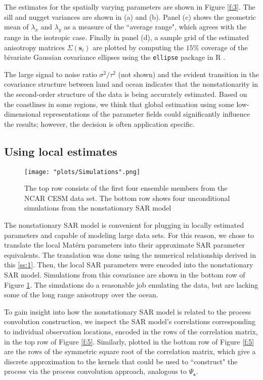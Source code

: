 \documentclass[review]{elsarticle}
\begin{document}
The estimates for the spatially varying parameters are shown in Figure \ref{f:3}. The sill and nugget variances are shown in (a) and (b). Panel (c) shows the geometric mean of $\lambda_x$ and $\lambda_y$ as a measure of the ``average range", which agrees with the range in the isotropic case. Finally in panel (d), a sample grid of the estimated anisotropy matrices $\Sigma(\mathbf s_i)$ are plotted by computing the $15\%$ coverage of the bivariate Gaussian covariance ellipses using the \texttt{ellipse} package in R \cite{ellipse}.

The large signal to noise ratio $\sigma^2/\tau^2$ (not shown) and the evident transition in the covariance structure between land and ocean indicates that the nonstationarity in the second-order structure of the data is being accurately estimated. Based on the coastlines in some regions, we think that global estimation using some low-dimensional representations of the parameter fields could significantly influence the results; however, the decision is often application specific.



\subsection{Using local estimates}

\begin{figure}
    \centering
    \texttt{[image: "plots/Simulations".png]}
    \caption{The top row consists of the first four ensemble members from the NCAR CESM data set. The bottom row shows four unconditional simulations from the nonstationary SAR model}
    \label{f:4}
\end{figure}


The nonstationary SAR model is convenient for plugging in locally estimated parameters and capable of modeling large data sets. For this reason, we chose to translate the local Mat\'ern parameters into their approximate SAR parameter equivalents. The translation was done using the numerical relationship derived in this \ref{ss:1}. Then, the local SAR parameters were encoded into the nonstationary SAR model. Simulations from this covariance are shown in the bottom row of Figure \ref{f:4}. The simulations do a reasonable job emulating the data, but are lacking some of the long range anisotropy over the ocean.

To gain insight into how the nonstationary SAR model is related to the process convolution construction, we inspect the SAR model's correlations corresponding to individual observation locations, encoded in the rows of the correlation matrix, in the top row of Figure \ref{f:5}. Similarly, plotted in the bottom row of Figure \ref{f:5} are the rows of the symmetric square root of the correlation matrix, which give a discrete approximation to the kernels that could be used to ``construct" the process via the process convolution approach, analogous to $ \Psi_{\mathbf{s}}$. 
\end{document}
